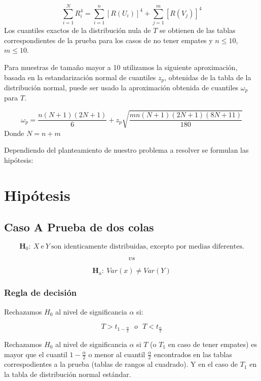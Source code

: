\documentclass[
  a4paper,
  oneside,
  openany]{book}
\begin{document}
\[ \sum_{i=1}^{N}R_{i}^4= \sum_{i=1}^{n}[R(U_{i})]^4+\sum_{j=1}^{m}[R(V_{j})]^4\]
Los cuantiles exactos de la distribución nula de \(T\) se obtienen de las tablas correspondientes de la prueba para los casos de no tener empates y \(n \leq 10\), \(m \leq 10\).

Para muestras de tamaño mayor a 10 utilizamos la siguiente aproximación, basada en la estandarización normal de cuantiles \(z_p\), obtenidas de la tabla de la distribución normal, puede ser usado la aproximación obtenida de cuantiles \(\omega_p\) para \(T\).

\[\omega_p= \frac{n(N+1)(2N+1)}{6}+z_{p}\sqrt{\frac{mn(N+1)(2N+1)(8N+11)}{180}}\]
Donde \(N= n+m\)

Dependiendo del planteamiento de nuestro problema a resolver se formulan las hipótesis:

\hypertarget{hipuxf3tesis-7}{%
\section{Hipótesis}\label{hipuxf3tesis-7}}

\hypertarget{caso-a-prueba-de-dos-colas-6}{%
\subsection*{Caso A Prueba de dos colas}\label{caso-a-prueba-de-dos-colas-6}}


\[\textbf{H}_0: \ X \ \mbox{e} \  Y \ \mbox{son identicamente distribuidas, excepto por medias diferentes.}\]

\[vs\]

\[\textbf{H}_a: \ Var(x) \neq  Var(Y)\]

\hypertarget{regla-de-decisiuxf3n-17}{%
\subsubsection*{Regla de decisión}\label{regla-de-decisiuxf3n-17}}


Rechazamos \(H_0\) al nivel de significancia \(\alpha\) si:

\[T>t_{1-\frac{\alpha}{2}} \ \ \   o \ \ \  T<t_{\frac{\alpha}{2}}\]

Rechazamos \(H_0\) al nivel de significancia \(\alpha\) si \(T\) (o \(T_1\) en caso de tener empates) es mayor que el cuantil \(1-\frac{\alpha}{2}\) o menor al cuantil \(\frac{\alpha}{2}\) encontrados en las tablas correspodientes a la prueba (tablas de rangos al cuadrado). Y en el caso de \(T_{1}\) en la tabla de distribución normal estándar.
\end{document}
